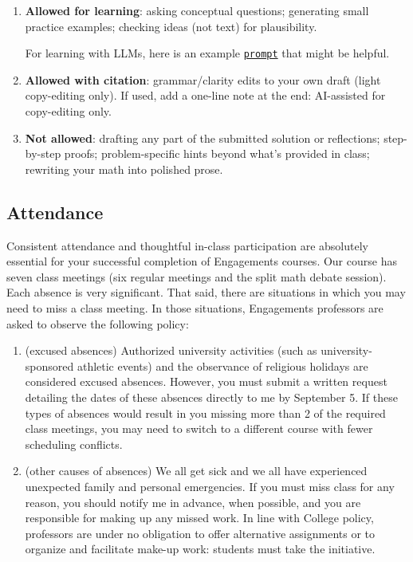 \documentclass[oneside,11pt]{amsart}
\begin{document}
\begin{enumerate}[$\bullet$]
  \item \textbf{Allowed for learning}: asking conceptual questions; generating small practice examples; checking ideas (not text) for plausibility.

\noindent
For learning with LLMs, here is an example \href{https://gist.githubusercontent.com/lenis2000/cb5ea004f8aa6461be71398e19ae488e/raw/a0103eab0b865a1cedf2f3bf3c00d217bd294005/AI_hint_prompt.txt}{\texttt{prompt}} that might be helpful.
  \item \textbf{Allowed with citation}: grammar/clarity edits to your own draft (light copy-editing only). If used, add a one-line note at the end: AI-assisted for copy-editing only.

  \item \textbf{Not allowed}: drafting any part of the submitted solution or reflections; step-by-step proofs; problem-specific hints beyond what's provided in class; rewriting your math into polished prose.
\end{enumerate}



\subsection{Attendance}

Consistent attendance and thoughtful in-class participation are absolutely essential for your successful completion of Engagements courses. Our course has seven class meetings (six regular meetings and the split math debate session).
Each absence is very significant. That said, there are situations in which you may need to miss a class meeting. In those situations, 
Engagements professors are asked to observe the following policy:

\begin{enumerate}[$\bullet$]
    \item (excused absences) Authorized university activities (such as university-sponsored athletic events) and the observance of religious holidays are considered excused absences. However, you must submit a written request detailing the dates of these absences directly to me by September 5. If these types of absences would result in you missing more than 2 of the required class meetings, you may need to switch to a different course with fewer scheduling conflicts.
    \item (other causes of absences) 
		We all get sick and we all have experienced unexpected family and personal emergencies. If you must miss class for any reason, you should notify me in advance, when possible, and you are responsible for making up any missed work. In line with College policy, professors are under no obligation to offer alternative assignments or to organize and facilitate make-up work: students must take the initiative.
\end{enumerate}
\end{document}
